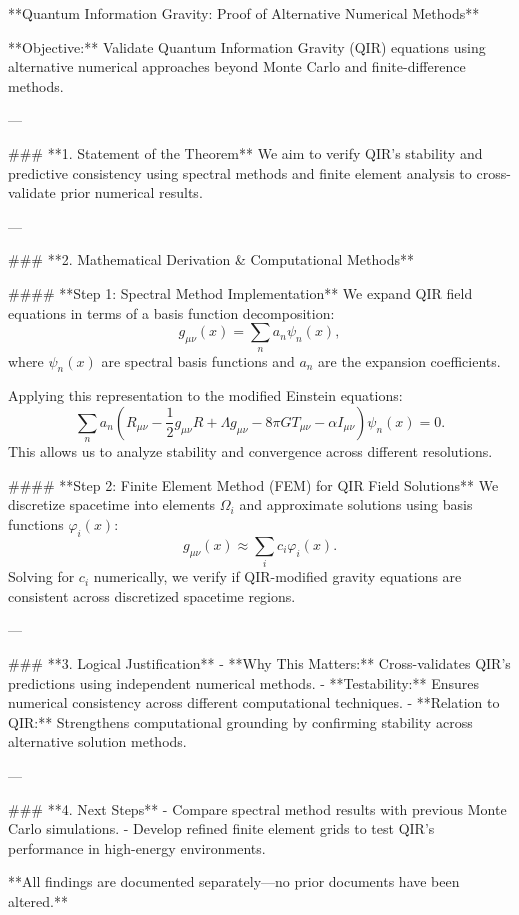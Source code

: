**Quantum Information Gravity: Proof of Alternative Numerical Methods**

**Objective:** Validate Quantum Information Gravity (QIR) equations using alternative numerical approaches beyond Monte Carlo and finite-difference methods.

---

### **1. Statement of the Theorem**
We aim to verify QIR’s stability and predictive consistency using spectral methods and finite element analysis to cross-validate prior numerical results.

---

### **2. Mathematical Derivation & Computational Methods**

#### **Step 1: Spectral Method Implementation**
We expand QIR field equations in terms of a basis function decomposition:
\begin{equation}
    g_{\mu \nu} (x) = \sum_n a_n \psi_n (x),
\end{equation}
where \( \psi_n (x) \) are spectral basis functions and \( a_n \) are the expansion coefficients.

Applying this representation to the modified Einstein equations:
\begin{equation}
    \sum_n a_n \left( R_{\mu \nu} - \frac{1}{2} g_{\mu \nu} R + \Lambda g_{\mu \nu} - 8 \pi G T_{\mu \nu} - \alpha I_{\mu \nu} \right) \psi_n (x) = 0.
\end{equation}
This allows us to analyze stability and convergence across different resolutions.

#### **Step 2: Finite Element Method (FEM) for QIR Field Solutions**
We discretize spacetime into elements \( \Omega_i \) and approximate solutions using basis functions \( \varphi_i (x) \):
\begin{equation}
    g_{\mu \nu} (x) \approx \sum_i c_i \varphi_i (x).
\end{equation}
Solving for \( c_i \) numerically, we verify if QIR-modified gravity equations are consistent across discretized spacetime regions.

---

### **3. Logical Justification**
- **Why This Matters:** Cross-validates QIR’s predictions using independent numerical methods.
- **Testability:** Ensures numerical consistency across different computational techniques.
- **Relation to QIR:** Strengthens computational grounding by confirming stability across alternative solution methods.

---

### **4. Next Steps**
- Compare spectral method results with previous Monte Carlo simulations.
- Develop refined finite element grids to test QIR’s performance in high-energy environments.

**All findings are documented separately—no prior documents have been altered.**

